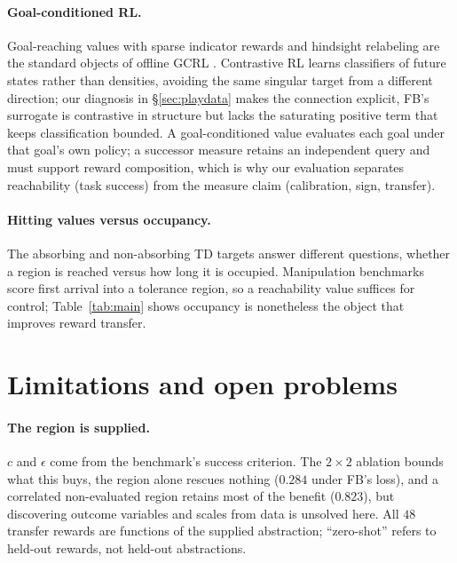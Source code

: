 \documentclass{article}
\newcommand{\cube}{c}
\begin{document}
\paragraph{Goal-conditioned RL.}
Goal-reaching values with sparse indicator rewards and hindsight relabeling are the standard objects of offline GCRL \citep{kaelbling1993learning,andrychowicz2017hindsight,kostrikov2021offline,park2023hiql}.
Contrastive RL \citep{eysenbach2022contrastive} learns classifiers of future states rather than densities, avoiding the same singular target from a different direction; our diagnosis in \S\ref{sec:playdata} makes the connection explicit, FB's surrogate is contrastive in structure but lacks the saturating positive term that keeps classification bounded.
A goal-conditioned value evaluates each goal under that goal's own policy; a successor measure retains an independent query and must support reward composition, which is why our evaluation separates reachability (task success) from the measure claim (calibration, sign, transfer).

\paragraph{Hitting values versus occupancy.}
The absorbing and non-absorbing TD targets answer different questions, whether a region is reached versus how long it is occupied.
Manipulation benchmarks score first arrival into a tolerance region, so a reachability value suffices for control; Table~\ref{tab:main} shows occupancy is nonetheless the object that improves reward transfer.

\section{Limitations and open problems}
\label{sec:limitations}

\paragraph{The region is supplied.}
$\cube$ and $\epsilon$ come from the benchmark's success criterion.
The $2\times2$ ablation bounds what this buys, the region alone rescues nothing ($0.284$ under FB's loss), and a correlated non-evaluated region retains most of the benefit ($0.823$), but discovering outcome variables and scales from data is unsolved here.
All $48$ transfer rewards are functions of the supplied abstraction; ``zero-shot'' refers to held-out rewards, not held-out abstractions.
\end{document}
